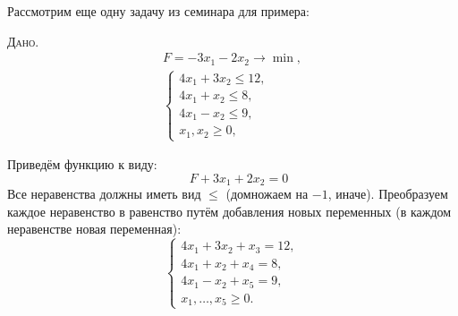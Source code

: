 %		
%		
%		
%	

\begin{example}
	Рассмотрим еще одну задачу из семинара для примера:
	
	\textsc{Дано.}
	\begin{gather*}
		F = -3 x_1 - 2 x_2 \to \min,  \\
		\begin{cases}
			4 x_1 + 3 x_2 \leqslant 12, \\
			4 x_1 + x_2 \leqslant 8, \\
			4 x_1 - x_2 \leqslant 9,\\
			x_1, x_2 \geqslant 0,
		\end{cases}
	\end{gather*}
	\begin{solution}
		Приведём функцию к виду:
	\begin{equation*}
		\quad F + 3 x_1 + 2 x_2 = 0
	\end{equation*}
	Все неравенства должны иметь вид $\leqslant$ (домножаем на $-1$, иначе). Преобразуем каждое неравенство в равенство путём добавления новых переменных (в каждом неравенстве новая переменная):
	\begin{equation*}
		\begin{cases}
			4 x_1 + 3 x_2 + x_3 = 12, \\
			4 x_1 + x_2 + x_4 = 8, \\
			4 x_1 - x_2 + x_5 = 9, \\
			x_1, \dotsc, x_5 \geqslant 0.
		\end{cases}
	\end{equation*}
	

\end{solution}
\end{example}
